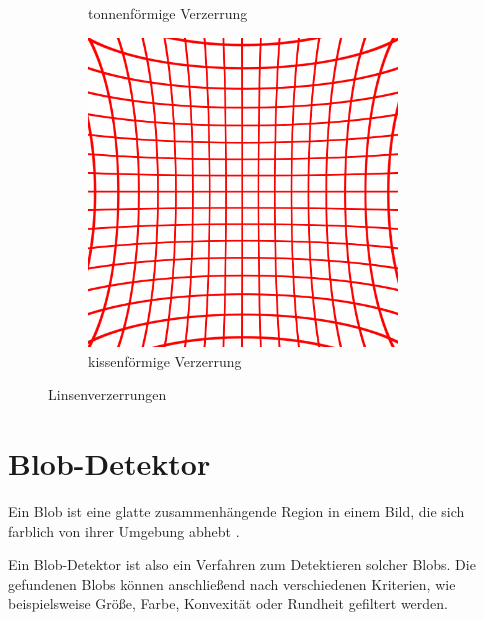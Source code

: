 \begin{figure}[!htb]
\begin{subfigure}{.33\textwidth}
		\caption{tonnenförmige Verzerrung}
		\label{fig:barrel}
	\end{subfigure}%
	\begin{subfigure}{.33\textwidth}
		\centering
		\includegraphics[width=0.9\textwidth]{images/cushionDistortion.png}
		\caption{kissenförmige Verzerrung}
		\label{fig:cushion}
	\end{subfigure}
	\caption{Linsenverzerrungen}
	\label{fig:distortion}
\end{figure}



\section{Blob-Detektor}
\label{s:blob}
\begin{definition}[Blob]\label{def:blob}
	Ein Blob ist eine glatte zusammenhängende Region in einem Bild, die sich farblich von ihrer Umgebung abhebt \cite{Lindeberg1993}.
\end{definition}

Ein Blob-Detektor ist also ein Verfahren zum Detektieren solcher Blobs. Die gefundenen Blobs können anschließend nach verschiedenen Kriterien, wie beispielsweise Größe, Farbe, Konvexität oder Rundheit gefiltert werden. 


